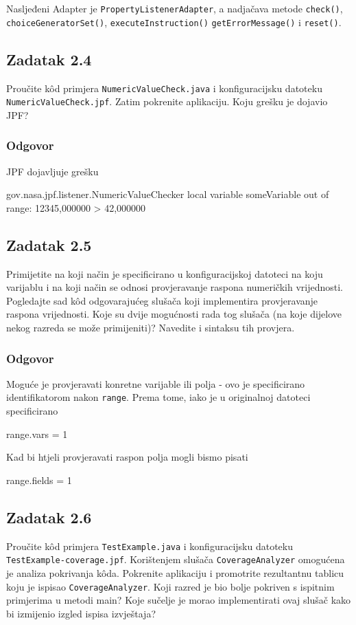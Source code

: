\documentclass{article}
\newcommand{\zadatak}[1]{\subsection{Zadatak #1}}
\newcommand{\odgovor}{\subsubsection*{Odgovor}}
\newcommand{\code}[1]{\colorbox{blue!11}{\texttt{#1}}}
\begin{document}
\noindent
Nasljeđeni Adapter je \texttt{PropertyListenerAdapter}, a nadjačava metode \code{check()}, \code{choiceGeneratorSet()}, \code{executeInstruction()} \code{getErrorMessage()} i\newline
\code{reset()}.

\zadatak{2.4}

Proučite kôd primjera \texttt{NumericValueCheck.java} i konfiguracijsku datoteku\newline
\texttt{NumericValueCheck.jpf}. Zatim pokrenite aplikaciju. Koju grešku je dojavio JPF?

\odgovor

JPF dojavljuje grešku 

\begin{ccode}
gov.nasa.jpf.listener.NumericValueChecker
local variable someVariable out of range: 12345,000000 > 42,000000
\end{ccode}

\zadatak{2.5}

Primijetite na koji način je specificirano u konfiguracijskoj datoteci na koju varijablu i na koji način se odnosi provjeravanje raspona numeričkih vrijednosti. Pogledajte sad kôd odgovarajućeg slušača koji implementira provjeravanje raspona vrijednosti. Koje su dvije mogućnosti rada tog slušača (na koje dijelove nekog razreda se može primijeniti)? Navedite i sintaksu tih provjera.

\odgovor

Moguće je provjeravati konretne varijable ili polja - ovo je specificirano identifikatorom nakon \texttt{range}. Prema tome, iako je u originalnoj datoteci specificirano

\begin{ccode}
range.vars = 1
\end{ccode}

\noindent
Kad bi htjeli provjeravati raspon polja mogli bismo pisati

\begin{ccode}
range.fields = 1
\end{ccode}

\zadatak{2.6}

Proučite kôd primjera \texttt{TestExample.java} i konfiguracijsku datoteku\newline
\texttt{TestExample-coverage.jpf}. Korištenjem slušača \texttt{CoverageAnalyzer} omogućena je analiza pokrivanja kôda. Pokrenite aplikaciju i promotrite rezultantnu tablicu koju je ispisao \texttt{CoverageAnalyzer}. Koji razred je bio bolje pokriven s ispitnim primjerima u metodi main? Koje sučelje je morao implementirati ovaj slušač kako bi izmijenio izgled ispisa izvještaja?
\end{document}
